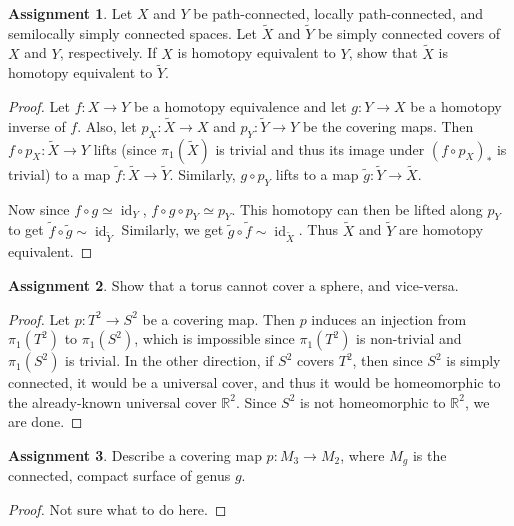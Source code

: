 \documentclass[12pt]{article}
\DeclareMathOperator{\id}{id}
\theoremstyle{definition}
\newtheorem{ex}{Assignment}
\begin{document}
\begin{ex}
	Let $X$ and $Y$ be path-connected, locally path-connected, and semilocally simply connected spaces.
	Let $\widetilde{X}$ and $\widetilde{Y}$ be simply connected covers of  $X$ and $Y$, respectively.
	If $X$ is homotopy equivalent to $Y$, show that $\widetilde{X}$ is homotopy equivalent to $\widetilde{Y}$.
\end{ex}
\begin{proof}
  Let $f : X \to Y$ be a homotopy equivalence and let $g : Y \to X$ be a homotopy inverse of $f$.
  Also, let $p_X : \widetilde{X} \to X$ and $p_Y : \widetilde{Y} \to Y$ be the covering maps.
  Then $f \circ p_X : \widetilde{X} \to Y$ lifts (since $\pi_1(\widetilde{X})$ is trivial and thus its image under $(f \circ p_X)_*$ is trivial) to a map $\widetilde{f} : \widetilde{X} \to \widetilde{Y}$.
  Similarly, $g \circ p_Y$ lifts to a map $\widetilde{g} : \widetilde{Y} \to \widetilde{X}$.

  Now since $f \circ g \simeq \id_Y$, $f \circ g \circ p_Y \simeq p_Y$.
  This homotopy can then be lifted along $p_Y$ to get $\widetilde{f} \circ \widetilde{g} \sim \id_{\widetilde{Y}}$
  Similarly, we get $\widetilde{g} \circ \widetilde{f} \sim \id_{\widetilde{X}}$.
  Thus $\widetilde{X}$ and $\widetilde{Y}$ are homotopy equivalent.
\end{proof}

\begin{ex}
	Show that a torus cannot cover a sphere, and vice-versa.
\end{ex}
\begin{proof}
	Let $p: T^2 \to S^2$ be a covering map.
	Then $p$ induces an injection from $\pi_1(T^2)$ to $\pi_1(S^2)$, which is impossible since $\pi_1(T^2)$ is non-trivial and $\pi_1(S^2)$ is trivial.
  In the other direction, if $S^2$ covers $T^2$, then since $S^2$ is simply connected, it would be a universal cover, and thus it would be homeomorphic to the already-known universal cover $\mathbb{R}^2$.
  Since $S^2$ is not homeomorphic to $\mathbb{R}^2$, we are done.
\end{proof}

\begin{ex}
	Describe a covering map $p : M_3 \to M_2$, where $M_g$ is the connected, compact surface of genus $g$.
\end{ex}
\begin{proof}
  Not sure what to do here.
\end{proof}
\end{document}
